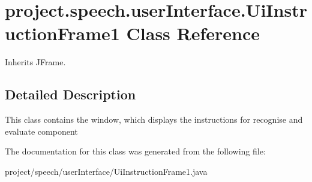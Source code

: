 \section{project.\+speech.\+user\+Interface.\+Ui\+Instruction\+Frame1 Class Reference}
\label{classproject_1_1speech_1_1user_interface_1_1_ui_instruction_frame1}


Inherits J\+Frame.



\subsection{Detailed Description}
This class contains the window, which displays the instructions for recognise and evaluate component 

The documentation for this class was generated from the following file\+:\begin{DoxyCompactItemize}
\item 
project/speech/user\+Interface/Ui\+Instruction\+Frame1.\+java\end{DoxyCompactItemize}
